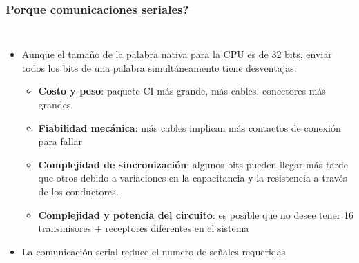 \documentclass[10.5pt,scale=1.0,t,aspectratio=169,hyperref={pdfpagelabels=false}]{beamer}
\begin{document}
\begin{frame}
	\frametitle{Porque comunicaciones seriales?}
	\begin{columns}
		
		\begin{itemize}
			\item Aunque el tamaño de la palabra nativa para la CPU es de 32 bits, enviar todos los bits de una palabra simultáneamente tiene desventajas:
			\begin{itemize}
				\item \textbf{Costo y peso}: paquete CI más grande, más cables, conectores más grandes
				\item \textbf{Fiabilidad mecánica}: más cables implican más contactos de conexión para fallar
				\item \textbf{Complejidad de sincronización}: algunos bits pueden llegar más tarde que otros debido a variaciones en la capacitancia y la resistencia a través de los conductores.
				\item \textbf{Complejidad y potencia del circuito}: es posible que no desee tener 16 transmisores + receptores diferentes en el sistema
			\end{itemize}
			\item La comunicación serial reduce el numero de señales requeridas
		\end{itemize}
		
		
		

\end{columns}
\end{frame}
\end{document}
